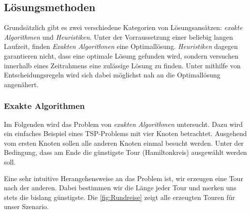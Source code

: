 \documentclass{article}
\begin{document}
\subsection{Lösungsmethoden}

Grundsätzlich gibt es zwei verschiedene Kategorien von Lösungsansätzen: \textit{exakte Algorithmen} und \textit{Heuristiken}. Unter der Vorraussetzung einer beliebig langen Laufzeit, finden \textit{Exakten Algorithmen} eine Optimallösung. \textit{Heuristiken} dagegen garantieren nicht, dass eine optimale Lösung gefunden wird, sondern versuchen innerhalb eines Zeitrahmens eine zulässige Lösung zu finden. Unter mithilfe von Entscheidungsregeln wird sich dabei möglichst nah an die Optimallösung angenähert.

\subsubsection{Exakte Algorithmen}
Im Folgenden wird das Problem von \textit{exakten Algorithmen} untersucht. Dazu wird ein einfaches Beispiel eines TSP-Problems mit vier Knoten betrachtet. Ausgehend vom ersten Knoten sollen alle anderen Knoten einmal besucht werden. Unter der Bedingung, dass am Ende die günstigste Tour (Hamiltonkreis) ausgewählt werden soll.
\par Eine sehr intuitive Herangehensweise an das Problem ist, wir erzeugen eine Tour nach der anderen. Dabei bestimmen wir die Länge jeder Tour und merken uns stets die bislang günstigste. Die \autoref{fig:Rundreise} zeigt alle erzeugten Touren für unser Szenario. 
\end{document}
